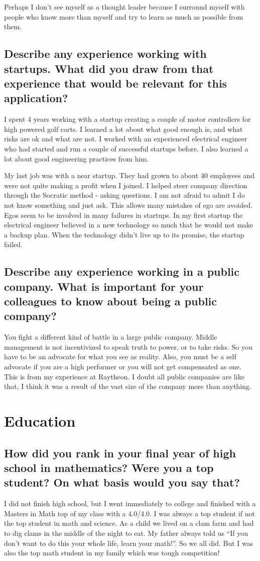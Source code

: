 \documentclass[letter,12pt]{article}
\begin{document}
Perhaps I don't see myself as a thought leader because I surround myself with people who know more than myself and try to learn as much as possible from them.

\subsection{Describe any experience working with startups. What did you draw from that experience that would be relevant for this application?}
I spent 4 years working with a startup creating a couple of motor controllers for high powered golf carts. I learned a lot about what good enough is, and what risks are ok and what are not. I worked with an experienced electrical engineer who had started and run a couple of successful startups before. I also learned a lot about good engineering practices from him.

My last job was with a near startup. They had grown to about 40 employees and were not quite making a profit when I joined. I helped steer company direction through the Socratic method - asking questions. I am not afraid to admit I do not know something and just ask. This allows many mistakes of ego are avoided. Egos seem to be involved in many failures in startups. In my first startup the electrical engineer believed in a new technology so much that he would not make a backup plan. When the technology didn't live up to its promise, the startup failed.

\subsection{Describe any experience working in a public company. What is important for your colleagues to know about being a public company?}
You fight a different kind of battle in a large public company. Middle management is not incentivized to speak truth to power, or to take risks. So you have to be an advocate for what you see as reality. Also, you must be a self advocate if you are a high performer or you will not get compensated as one. This is from my experience at Raytheon. I doubt all public companies are like that, I think it was a result of the vast size of the company more than anything.

\section{Education}

\subsection{How did you rank in your final year of high school in mathematics? Were you a top student? On what basis would you say that?}
I did not finish high school, but I went immediately to college and finished with a Masters in Math top of my class with a 4.0/4.0. I was always a top student if not the top student in math and science. As a child we lived on a clam farm and had to dig clams in the middle of the night to eat. My father always told us ``If you don't want to do this your whole life, learn your math!''. So we all did. But I was also the top math student in my family which was tough competition!
\end{document}
